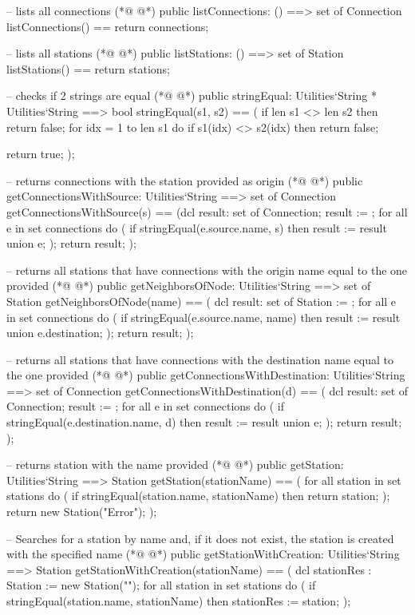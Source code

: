 \begin{vdmpp}[breaklines=true]
 -- lists all connections
(*@
\label{listConnections:65}
@*)
 public listConnections: () ==> set of Connection 
  listConnections() == return connections;
  
 -- lists all stations
(*@
\label{listStations:69}
@*)
 public listStations: () ==> set of Station
  listStations() == return stations;
  
 -- checks if 2 strings are equal
(*@
\label{stringEqual:73}
@*)
 public stringEqual: Utilities`String * Utilities`String ==> bool
 stringEqual(s1, s2) ==
 (
  if len s1 <> len s2 then
   return false;
  for idx = 1 to len s1 do
   if s1(idx) <> s2(idx) then return false;
  
  return true;
 );
 
 -- returns connections with the station provided as origin
(*@
\label{getConnectionsWithSource:85}
@*)
 public getConnectionsWithSource: Utilities`String ==> set of Connection
 getConnectionsWithSource(s) ==
 (dcl result: set of Connection;
  result := {};
  for all e in set connections do
  (
   if stringEqual(e.source.name, s) then result := result union {e}; 
  );
  return result;
 );
 
 -- returns all stations that have connections with the origin name equal to the one provided
(*@
\label{getNeighborsOfNode:97}
@*)
 public getNeighborsOfNode: Utilities`String ==> set of Station
 getNeighborsOfNode(name) ==
 (
  dcl result: set of Station := {};
  for all e in set connections do
  (
   if stringEqual(e.source.name, name) then result := result union {e.destination};
  );
  return result;
 );
 
 -- returns all stations that have connections with the destination name equal to the one provided
(*@
\label{getConnectionsWithDestination:109}
@*)
 public getConnectionsWithDestination: Utilities`String ==> set of Connection
 getConnectionsWithDestination(d) ==
 (
  dcl result: set of Connection;
   result := {};
  for all e in set connections do
  (
   if stringEqual(e.destination.name, d) then result := result union {e}; 
  );
  return result;
 );   
 
 -- returns station with the name provided
(*@
\label{getStation:122}
@*)
 public getStation: Utilities`String ==> Station
 getStation(stationName) ==
 (
  for all station in set stations do (
   if stringEqual(station.name, stationName) then 
     return station;
  ); 
  return new Station("Error");
 );
 
 
 -- Searches for a station by name and, if it does not exist, the station is created with the specified name 
(*@
\label{getStationWithCreation:134}
@*)
 public getStationWithCreation: Utilities`String ==> Station
 getStationWithCreation(stationName) == 
 (
  dcl stationRes : Station := new Station("");
  for all station in set stations do (
   if stringEqual(station.name, stationName) then stationRes := station;
  ); 
  

\end{vdmpp}
